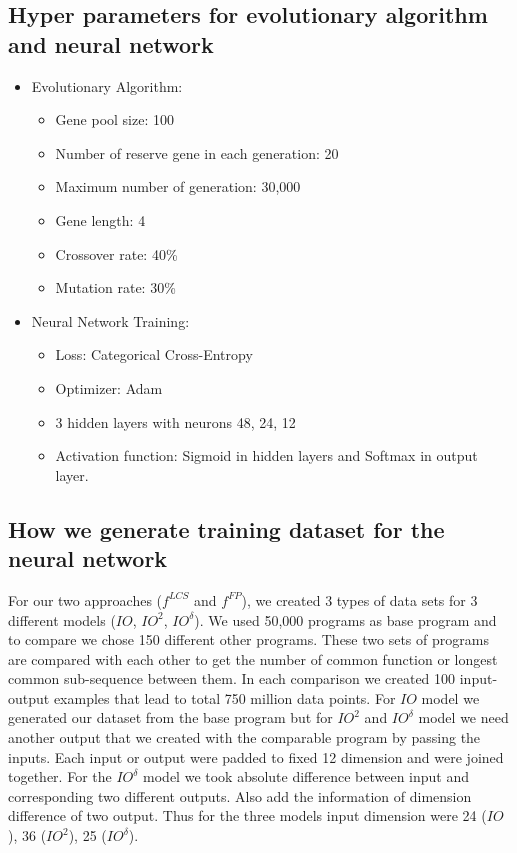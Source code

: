 \subsection{Hyper parameters for evolutionary algorithm and neural network}
\begin{itemize}
\item{Evolutionary Algorithm:}
    \begin{itemize}
        \item{} Gene pool size: 100
        \item{} Number of reserve gene in each generation: 20
        \item{} Maximum number of generation: 30,000
        \item{} Gene length: 4
        \item{} Crossover rate: 40\%
        \item{} Mutation rate: 30\%
    \end{itemize}
\item{Neural Network Training:}
    \begin{itemize}
        \item{} Loss: Categorical Cross-Entropy
        \item{} Optimizer: Adam
        \item{} 3 hidden layers with neurons 48, 24, 12
        \item{} Activation function: Sigmoid in hidden layers and Softmax in output layer.
    \end{itemize}

\end{itemize}

\subsection{How we generate training dataset for the neural network}
 
For our two approaches ($f^{LCS}$ and $f^{FP}$), we created 3 types of data sets for 3 different models ($IO$, $IO^2$, $IO^\delta$). We used 50,000 programs as base program and to compare we chose 150 different other programs. These two sets of programs are compared with each other to get the number of common function or longest common sub-sequence between them. In each comparison we created 100 input-output examples that lead to total 750 million data points. For $IO$ model we generated our dataset from the base program but for $IO^2$ and $IO^\delta$ model we need another output that we created with the comparable program by passing the inputs. Each input or output were padded to fixed 12 dimension and  were joined together. For the $IO^\delta$ model we took absolute difference between input and corresponding two different outputs. Also add the information of dimension difference of two output. Thus for the three models input dimension were 24 ($IO$), 36 ($IO^2$), 25 ($IO^\delta$).

